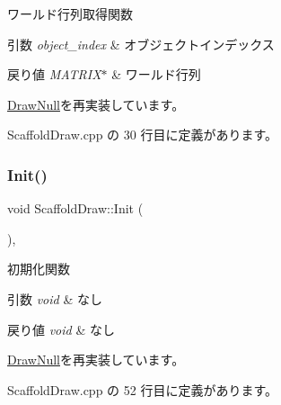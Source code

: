 ワールド行列取得関数 


\begin{DoxyParams}{引数}
{\em object\+\_\+index} & オブジェクトインデックス \\
\hline
\end{DoxyParams}

\begin{DoxyRetVals}{戻り値}
{\em M\+A\+T\+R\+I\+X$\ast$} & ワールド行列 \\
\hline
\end{DoxyRetVals}


\mbox{\hyperlink{class_draw_null_a9aac059eb3b5d1f77e8bd3aa0647cff9}{Draw\+Null}}を再実装しています。



 Scaffold\+Draw.\+cpp の 30 行目に定義があります。

\mbox{\label{class_scaffold_draw_a707921e63d07543692e8e9fd1b2dcc36}} 
\subsubsection{\texorpdfstring{Init()}{Init()}}
{\footnotesize\ttfamily void Scaffold\+Draw\+::\+Init (\begin{DoxyParamCaption}{ }\end{DoxyParamCaption})\hspace{0.3cm}{\ttfamily [override]}, {\ttfamily [virtual]}}



初期化関数 


\begin{DoxyParams}{引数}
{\em void} & なし \\
\hline
\end{DoxyParams}

\begin{DoxyRetVals}{戻り値}
{\em void} & なし \\
\hline
\end{DoxyRetVals}


\mbox{\hyperlink{class_draw_null_a20aef1e54c1a158b741bfd731e18efdf}{Draw\+Null}}を再実装しています。



 Scaffold\+Draw.\+cpp の 52 行目に定義があります。

\mbox{\label{class_scaffold_draw_a5a377eb53b13402bf788d13c9b6492b2}} 
